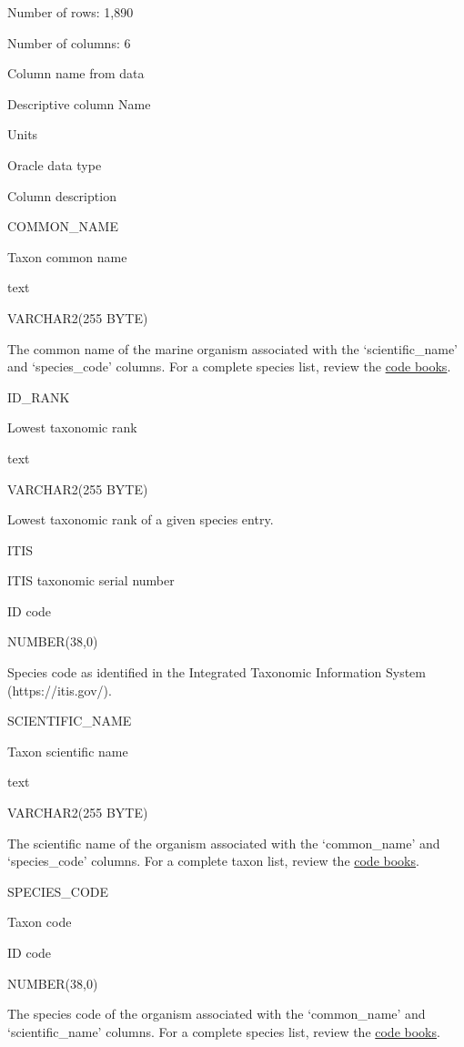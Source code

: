 \documentclass[
  letterpaper,
  oneside,
  open=any]{scrbook}
\begin{document}
Number of rows: 1,890

Number of columns: 6

Column name from data

Descriptive column Name

Units

Oracle data type

Column description

COMMON\_NAME

Taxon common name

text

VARCHAR2(255 BYTE)

The common name of the marine organism associated with the
`scientific\_name' and `species\_code' columns. For a complete species
list, review the
\href{https://www.fisheries.noaa.gov/resource/document/groundfish-survey-species-code-manual-and-data-codes-manual}{code
books}.

ID\_RANK

Lowest taxonomic rank

text

VARCHAR2(255 BYTE)

Lowest taxonomic rank of a given species entry.

ITIS

ITIS taxonomic serial number

ID code

NUMBER(38,0)

Species code as identified in the Integrated Taxonomic Information
System (https://itis.gov/).

SCIENTIFIC\_NAME

Taxon scientific name

text

VARCHAR2(255 BYTE)

The scientific name of the organism associated with the `common\_name'
and `species\_code' columns. For a complete taxon list, review the
\href{https://www.fisheries.noaa.gov/resource/document/groundfish-survey-species-code-manual-and-data-codes-manual}{code
books}.

SPECIES\_CODE

Taxon code

ID code

NUMBER(38,0)

The species code of the organism associated with the `common\_name' and
`scientific\_name' columns. For a complete species list, review the
\href{https://www.fisheries.noaa.gov/resource/document/groundfish-survey-species-code-manual-and-data-codes-manual}{code
books}.
\end{document}
